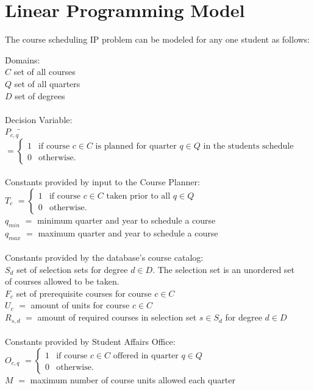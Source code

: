 \documentclass[a4paper,12pt]{article}
\begin{document}
\section{Linear Programming Model}
The course scheduling IP problem can be modeled for any one student as follows:
\begin{tabbing}
\indent\=Domains:\\
\>$C$ set of all courses\\
\>$Q$ set of all quarters\\
\>$D$ set of degrees\\\\

\>Decision Variable:\\

\>$ P_{c,q}\ $\=$= \left\{ \begin{array}{ll}
         1 & \mbox{if course $c \in C$ is planned for quarter $q \in Q$ in the students schedule}\\
         0 & \mbox{otherwise}.\end{array} \right. $\\\\
         
\>Constants provided by input to the Course Planner:\\

\>$ T_c$ \>$= \left\{ \begin{array}{ll}
         1 & \mbox{if course $c \in C$ taken prior to all $q \in Q$}\\
         0 & \mbox{otherwise}.\end{array} \right. $\\
\>$q_{min}$\> $=$ minimum quarter and year to schedule a course\\
\>$q_{max}$\> $=$ maximum quarter and year to schedule a course\\\\
         
\>Constants provided by the database's course catalog:\\
\>$S_d$ set of selection sets for degree $d \in D$. The selection set is an unordered set\\\>of courses allowed to be taken.\\
\>$F_c$ set of prerequisite courses for course $c \in C$\\
\>$U_c$ \> $=$ amount of units for course $c \in C$\\
\>$R_{s,d}$ \> $=$ amount of required courses in selection set $s \in S_d$ for degree $d \in D$\\\\

\>Constants provided by Student Affairs Office:\\
\>$ O_{c,q}$ \> $= \left\{ \begin{array}{ll}
         1 & \mbox{if course $c \in C$ offered in quarter $q \in Q$}\\
         0 & \mbox{otherwise}.\end{array} \right. $\\
\>$M$ \> $=$ maximum number of course units allowed each quarter\\
\end{tabbing}
\end{document}
